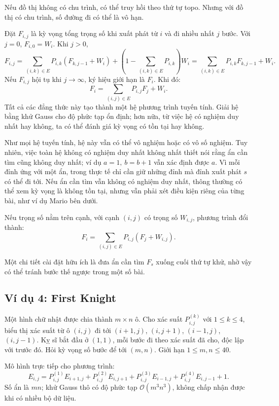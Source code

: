 \documentclass[11pt]{article}
\newcommand{\Oh}{\mathcal{O}}
\begin{document}
Nếu đồ thị không có chu trình, có thể truy hồi theo thứ tự topo. Nhưng với đồ
thị có chu trình, số đường đi có thể là vô hạn.

Đặt \(F_{i,j}\) là kỳ vọng tổng trọng số khi xuất phát từ \(i\) và đi nhiều
nhất \(j\) bước. Với \(j=0\), \(F_{i,0}=W_i\). Khi \(j>0\),
\[
  F_{i,j}
  =\sum_{(i,k)\in E}P_{i,k}(F_{k,j-1}+W_i)
  +\left(1-\sum_{(i,k)\in E}P_{i,k}\right)W_i
  =\sum_{(i,k)\in E}P_{i,k}F_{k,j-1}+W_i.
\]
Nếu \(F_{i,j}\) hội tụ khi \(j\to\infty\), ký hiệu giới hạn là \(F_i\). Khi
đó:
\[
  F_i=\sum_{(i,j)\in E} P_{i,j}F_j+W_i.
\]
Tất cả các đẳng thức này tạo thành một hệ phương trình tuyến tính. Giải hệ
bằng khử Gauss cho độ phức tạp ổn định; hơn nữa, từ việc hệ có nghiệm duy
nhất hay không, ta có thể đánh giá kỳ vọng có tồn tại hay không.

Như mọi hệ tuyến tính, hệ này vẫn có thể vô nghiệm hoặc có vô số nghiệm. Tuy
nhiên, việc toàn hệ không có nghiệm duy nhất không nhất thiết nói rằng ẩn cần
tìm cũng không duy nhất; ví dụ \(a=1,\ b=b+1\) vẫn xác định được \(a\). Vì
mỗi đỉnh ứng với một ẩn, trong thực tế chỉ cần giữ những đỉnh mà đỉnh xuất
phát \(s\) có thể đi tới. Nếu ẩn cần tìm vẫn không có nghiệm duy nhất, thông
thường có thể xem kỳ vọng là không tồn tại, nhưng vẫn phải xét điều kiện riêng
của từng bài, như ví dụ Mario bên dưới.

Nếu trọng số nằm trên cạnh, với cạnh \((i,j)\) có trọng số \(W_{i,j}\), phương
trình đổi thành:
\[
  F_i=\sum_{(i,j)\in E} P_{i,j}(F_j+W_{i,j}).
\]

Một chi tiết cài đặt hữu ích là đưa ẩn cần tìm \(F_s\) xuống cuối thứ tự khử,
nhờ vậy có thể tránh bước thế ngược trong một số bài.

\subsection{Ví dụ 4: First Knight}

Một hình chữ nhật được chia thành \(m\times n\) ô. Cho xác suất
\(P_{i,j}^{(k)}\) với \(1\le k\le4\), biểu thị xác suất từ ô \((i,j)\) đi tới
\((i+1,j)\), \((i,j+1)\), \((i-1,j)\), \((i,j-1)\). Kỵ sĩ bắt đầu ở
\((1,1)\), mỗi bước đi theo xác suất đã cho, độc lập với trước đó. Hỏi kỳ vọng
số bước để tới \((m,n)\). Giới hạn \(1\le m,n\le40\).

Mô hình trực tiếp cho phương trình:
\[
  E_{i,j}=
  P_{i,j}^{(1)}E_{i+1,j}
  +P_{i,j}^{(2)}E_{i,j+1}
  +P_{i,j}^{(3)}E_{i-1,j}
  +P_{i,j}^{(4)}E_{i,j-1}
  +1.
\]
Số ẩn là \(mn\); khử Gauss thô có độ phức tạp \(\Oh(m^3n^3)\), không chấp
nhận được khi có nhiều bộ dữ liệu.
\end{document}
